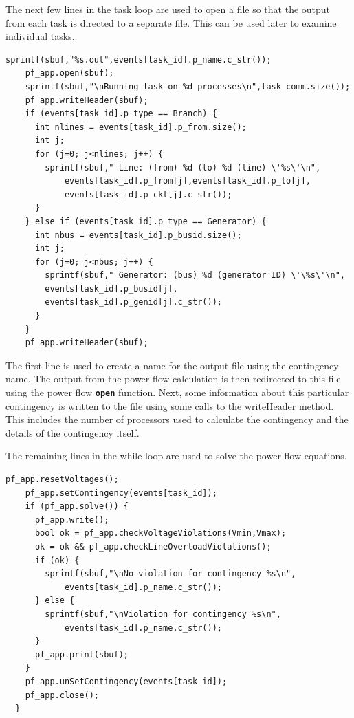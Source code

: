 \documentclass[12pt]{report} %
\begin{document}
The next few lines in the task loop are used to open a file so that the output from each task is directed to a separate file. This can be used later to examine individual tasks.

{
\color{red}
\begin{Verbatim}[fontseries=b]
    sprintf(sbuf,"%s.out",events[task_id].p_name.c_str());
    pf_app.open(sbuf);
    sprintf(sbuf,"\nRunning task on %d processes\n",task_comm.size());
    pf_app.writeHeader(sbuf);
    if (events[task_id].p_type == Branch) {
      int nlines = events[task_id].p_from.size();
      int j;
      for (j=0; j<nlines; j++) {
        sprintf(sbuf," Line: (from) %d (to) %d (line) \'%s\'\n",
            events[task_id].p_from[j],events[task_id].p_to[j],
            events[task_id].p_ckt[j].c_str());
      }
    } else if (events[task_id].p_type == Generator) {
      int nbus = events[task_id].p_busid.size();
      int j;
      for (j=0; j<nbus; j++) {
        sprintf(sbuf," Generator: (bus) %d (generator ID) \'\%s\'\n",
        events[task_id].p_busid[j],
        events[task_id].p_genid[j].c_str());
      }
    }
    pf_app.writeHeader(sbuf);
\end{Verbatim}
}

The first line is used to create a name for the output file using the contingency name. The output from the power flow calculation is then redirected to this file using the power flow \texttt{\textbf{open}} function. Next, some information about this particular contingency is written to the file using some calls to the writeHeader method. This includes the number of processors used to calculate the contingency and the details of the contingency itself.

The remaining lines in the while loop are used to solve the power flow equations.

{
\color{red}
\begin{Verbatim}[fontseries=b]
    pf_app.resetVoltages();
    pf_app.setContingency(events[task_id]);
    if (pf_app.solve()) {
      pf_app.write();
      bool ok = pf_app.checkVoltageViolations(Vmin,Vmax);
      ok = ok && pf_app.checkLineOverloadViolations();
      if (ok) {
        sprintf(sbuf,"\nNo violation for contingency %s\n",
            events[task_id].p_name.c_str());
      } else {
        sprintf(sbuf,"\nViolation for contingency %s\n",
            events[task_id].p_name.c_str());
      }
      pf_app.print(sbuf);
    }
    pf_app.unSetContingency(events[task_id]);
    pf_app.close();
  }
\end{Verbatim}
}
\end{document}
